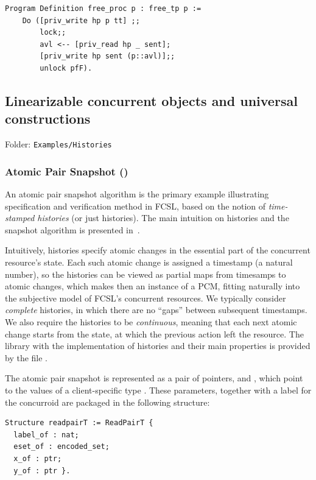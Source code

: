 \begin{lstlisting}
Program Definition free_proc p : free_tp p := 
    Do ([priv_write hp p tt] ;;
        lock;;
        avl <-- [priv_read hp _ sent];
        [priv_write hp sent (p::avl)];;
        unlock pfF).  
\end{lstlisting}

\subsection{Linearizable concurrent objects and universal
  constructions}
\label{sec:hist}

Folder: \texttt{Examples/Histories}

\subsubsection{Atomic Pair Snapshot ()}
\label{sec:atomic-snapshot}

An atomic pair snapshot algorithm is the primary example illustrating
specification and verification method in FCSL, based on the notion of
\emph{time-stamped histories} (or just histories). The main intuition
on histories and the snapshot algorithm is presented in~\cite[\S
2]{Sergey-al:ESOP15}.

Intuitively, histories specify atomic changes in the essential part of
the concurrent resource's state. Each such atomic change is assigned a
timestamp (a natural number), so the histories can be viewed as
partial maps from timesamps to atomic changes, which makes then an
instance of a PCM, fitting naturally into the subjective model of
FCSL's concurrent resources. We typically consider \emph{complete}
histories, in which there are no ``gaps'' between subsequent
timestamps. We also require the histories to be \emph{continuous},
meaning that each next atomic change starts from the state, at
which the previous action left the resource. The library with the
implementation of histories and their main properties is provided by
the file .

The atomic pair snapshot is represented as a pair of pointers,
 and , which point to the values of a client-specific
type . These parameters, together with a label
 for the concurroid are packaged in the following
structure:

\begin{lstlisting}
Structure readpairT := ReadPairT {
  label_of : nat;
  eset_of : encoded_set;
  x_of : ptr; 
  y_of : ptr }.
\end{lstlisting}

